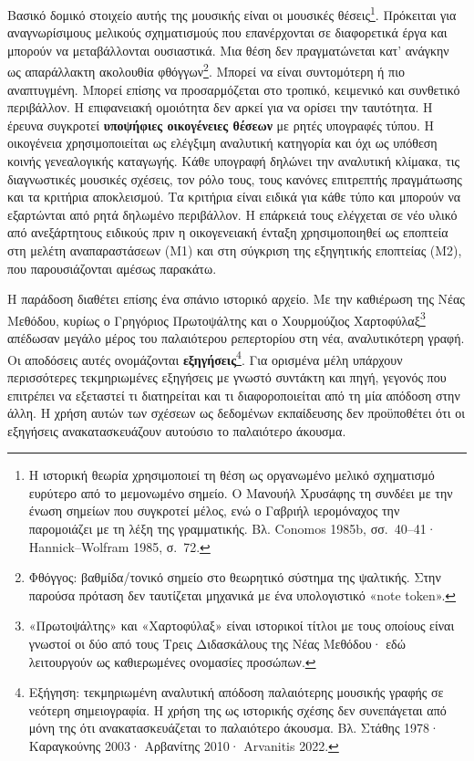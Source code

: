 \documentclass[11pt,a4paper]{article}
\begin{document}
Βασικό δομικό στοιχείο αυτής της μουσικής είναι οι μουσικές θέσεις\footnote{Η ιστορική θεωρία χρησιμοποιεί τη θέση ως οργανωμένο μελικό σχηματισμό ευρύτερο από το μεμονωμένο σημείο. Ο Μανουήλ Χρυσάφης τη συνδέει με την ένωση σημείων που συγκροτεί μέλος, ενώ ο Γαβριήλ ιερομόναχος την παρομοιάζει με τη λέξη της γραμματικής. Βλ. Conomos 1985b, σσ.~40--41· Hannick--Wolfram 1985, σ.~72.}. Πρόκειται για αναγνωρίσιμους μελικούς σχηματισμούς που επανέρχονται σε διαφορετικά έργα και μπορούν να μεταβάλλονται ουσιαστικά. Μια θέση δεν πραγματώνεται κατ' ανάγκην ως απαράλλακτη ακολουθία φθόγγων\footnote{Φθόγγος: βαθμίδα/τονικό σημείο στο θεωρητικό σύστημα της ψαλτικής. Στην παρούσα πρόταση δεν ταυτίζεται μηχανικά με ένα υπολογιστικό «note token».}. Μπορεί να είναι συντομότερη ή πιο αναπτυγμένη. Μπορεί επίσης να προσαρμόζεται στο τροπικό, κειμενικό και συνθετικό περιβάλλον. Η επιφανειακή ομοιότητα δεν αρκεί για να ορίσει την ταυτότητα. Η έρευνα συγκροτεί \textbf{υποψήφιες οικογένειες θέσεων} με ρητές υπογραφές τύπου. Η οικογένεια χρησιμοποιείται ως ελέγξιμη αναλυτική κατηγορία και όχι ως υπόθεση κοινής γενεαλογικής καταγωγής. Κάθε υπογραφή δηλώνει την αναλυτική κλίμακα, τις διαγνωστικές μουσικές σχέσεις, τον ρόλο τους, τους κανόνες επιτρεπτής πραγμάτωσης και τα κριτήρια αποκλεισμού. Τα κριτήρια είναι ειδικά για κάθε τύπο και μπορούν να εξαρτώνται από ρητά δηλωμένο περιβάλλον. Η επάρκειά τους ελέγχεται σε νέο υλικό από ανεξάρτητους ειδικούς πριν η οικογενειακή ένταξη χρησιμοποιηθεί ως εποπτεία στη μελέτη αναπαραστάσεων (M1) και στη σύγκριση της εξηγητικής εποπτείας (M2), που παρουσιάζονται αμέσως παρακάτω.

Η παράδοση διαθέτει επίσης ένα σπάνιο ιστορικό αρχείο. Με την καθιέρωση της Νέας Μεθόδου, κυρίως ο Γρηγόριος Πρωτοψάλτης και ο Χουρμούζιος Χαρτοφύλαξ\footnote{«Πρωτοψάλτης» και «Χαρτοφύλαξ» είναι ιστορικοί τίτλοι με τους οποίους είναι γνωστοί οι δύο από τους Τρεις Διδασκάλους της Νέας Μεθόδου· εδώ λειτουργούν ως καθιερωμένες ονομασίες προσώπων.} απέδωσαν μεγάλο μέρος του παλαιότερου ρεπερτορίου στη νέα, αναλυτικότερη γραφή. Οι αποδόσεις αυτές ονομάζονται \textbf{εξηγήσεις}\footnote{Εξήγηση: τεκμηριωμένη αναλυτική απόδοση παλαιότερης μουσικής γραφής σε νεότερη σημειογραφία. Η χρήση της ως ιστορικής σχέσης δεν συνεπάγεται από μόνη της ότι ανακατασκευάζεται το παλαιότερο άκουσμα. Βλ. Στάθης 1978· Καραγκούνης 2003· Αρβανίτης 2010· Arvanitis 2022.}. Για ορισμένα μέλη υπάρχουν περισσότερες τεκμηριωμένες εξηγήσεις με γνωστό συντάκτη και πηγή, γεγονός που επιτρέπει να εξεταστεί τι διατηρείται και τι διαφοροποιείται από τη μία απόδοση στην άλλη. Η χρήση αυτών των σχέσεων ως δεδομένων εκπαίδευσης δεν προϋποθέτει ότι οι εξηγήσεις ανακατασκευάζουν αυτούσιο το παλαιότερο άκουσμα.
\end{document}
